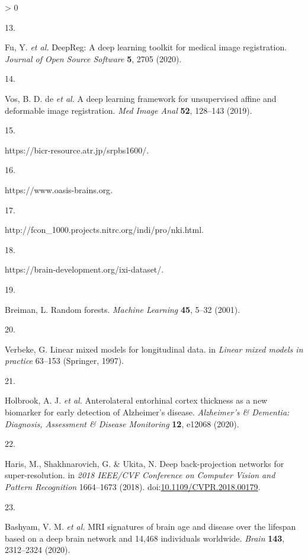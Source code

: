 \documentclass[
  12pt,
]{article}
\newlength{\cslhangindent}
\newlength{\csllabelwidth}
\newenvironment{CSLReferences}[3] %
 {%
  \setlength{\parindent}{0pt}
  \ifodd #1 \everypar{\setlength{\hangindent}{\cslhangindent}}\ignorespaces\fi
  \ifnum #2 > 0
  \setlength{\parskip}{#3\baselineskip}
  \fi
 }%
 {}
\newcommand{\CSLLeftMargin}[1]{\parbox[t]{\maxof{\widthof{#1}}{\csllabelwidth}}{#1}}
\newcommand{\CSLRightInline}[1]{\parbox[t]{\linewidth}{#1}}
\begin{document}
\begin{CSLReferences}{0}{0}
\leavevmode\hypertarget{ref-Fu:2020aa}{}%
\CSLLeftMargin{13. }
\CSLRightInline{Fu, Y. \emph{et al.} DeepReg: A deep learning toolkit
for medical image registration. \emph{Journal of Open Source Software}
\textbf{5}, 2705 (2020).}

\leavevmode\hypertarget{ref-Vos:2019wr}{}%
\CSLLeftMargin{14. }
\CSLRightInline{Vos, B. D. de \emph{et al.} A deep learning framework
for unsupervised affine and deformable image registration. \emph{Med
Image Anal} \textbf{52}, 128--143 (2019).}

\leavevmode\hypertarget{ref-srpb}{}%
\CSLLeftMargin{15. }
\CSLRightInline{{https://bicr-resource.atr.jp/srpbs1600/}.}

\leavevmode\hypertarget{ref-oasis}{}%
\CSLLeftMargin{16. }
\CSLRightInline{{https://www.oasis-brains.org}.}

\leavevmode\hypertarget{ref-nki}{}%
\CSLLeftMargin{17. }
\CSLRightInline{{http://fcon\_1000.projects.nitrc.org/indi/pro/nki.html}.}

\leavevmode\hypertarget{ref-ixi}{}%
\CSLLeftMargin{18. }
\CSLRightInline{{https://brain-development.org/ixi-dataset/}.}

\leavevmode\hypertarget{ref-Breiman:2001aa}{}%
\CSLLeftMargin{19. }
\CSLRightInline{Breiman, L. Random forests. \emph{Machine Learning}
\textbf{45}, 5--32 (2001).}

\leavevmode\hypertarget{ref-verbeke1997linear}{}%
\CSLLeftMargin{20. }
\CSLRightInline{Verbeke, G. Linear mixed models for longitudinal data.
in \emph{Linear mixed models in practice} 63--153 (Springer, 1997).}

\leavevmode\hypertarget{ref-holbrook2020anterolateral}{}%
\CSLLeftMargin{21. }
\CSLRightInline{Holbrook, A. J. \emph{et al.} Anterolateral entorhinal
cortex thickness as a new biomarker for early detection of {A}lzheimer's
disease. \emph{Alzheimer's \& Dementia: Diagnosis, Assessment \& Disease
Monitoring} \textbf{12}, e12068 (2020).}

\leavevmode\hypertarget{ref-Haris:2018aa}{}%
\CSLLeftMargin{22. }
\CSLRightInline{Haris, M., Shakhnarovich, G. \& Ukita, N. Deep
back-projection networks for super-resolution. in \emph{2018 {IEEE/CVF}
{C}onference on {C}omputer {V}ision and {P}attern {R}ecognition}
1664--1673 (2018).
doi:\href{https://doi.org/10.1109/CVPR.2018.00179}{10.1109/CVPR.2018.00179}.}

\leavevmode\hypertarget{ref-Bashyam:2020aa}{}%
\CSLLeftMargin{23. }
\CSLRightInline{Bashyam, V. M. \emph{et al.} MRI signatures of brain age
and disease over the lifespan based on a deep brain network and 14,468
individuals worldwide. \emph{Brain} \textbf{143}, 2312--2324 (2020).}


\end{CSLReferences}
\end{document}
